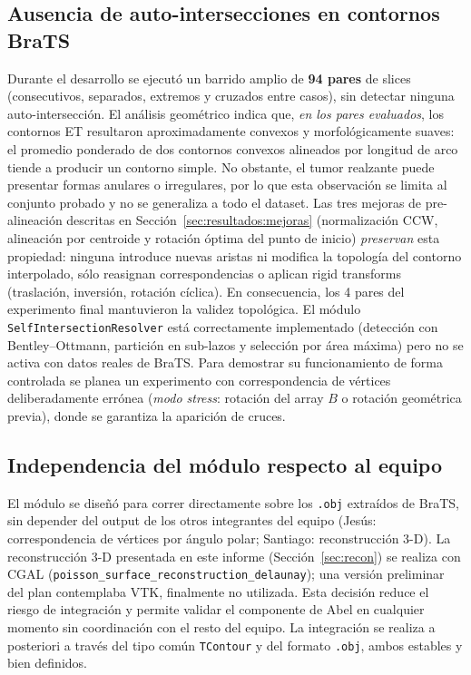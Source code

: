 \documentclass[conference]{IEEEtran}
\begin{document}
\subsection{Ausencia de auto-intersecciones en contornos
            BraTS}
\label{sec:decisiones:noselfint}
Durante el desarrollo se ejecutó un barrido amplio de
\textbf{94 pares} de slices (consecutivos, separados,
extremos y cruzados entre casos), sin detectar ninguna
auto-intersección. El análisis geométrico indica que,
\emph{en los pares evaluados}, los contornos ET resultaron
aproximadamente convexos y morfológicamente suaves: el promedio
ponderado de dos contornos convexos alineados por longitud de arco
tiende a producir un contorno simple. No obstante, el tumor realzante
puede presentar formas anulares o irregulares, por lo que esta
observación se limita al conjunto probado y no se generaliza a todo el
dataset. Las tres mejoras de
pre-alineación descritas en
Sección~\ref{sec:resultados:mejoras} (normalización CCW,
alineación por centroide y rotación óptima del punto de
inicio) \emph{preservan} esta propiedad: ninguna introduce
nuevas aristas ni modifica la topología del contorno
interpolado, sólo reasignan correspondencias o aplican
rigid transforms (traslación, inversión, rotación cíclica).
En consecuencia, los 4 pares del experimento final
mantuvieron la validez topológica. El módulo
\texttt{SelfIntersectionResolver} está correctamente
implementado (detección con Bentley--Ottmann, partición en
sub-lazos y selección por área máxima) pero no se activa
con datos reales de BraTS. Para demostrar su funcionamiento
de forma controlada se planea un experimento con
correspondencia de vértices deliberadamente errónea
(\emph{modo stress}: rotación del array $B$ o rotación
geométrica previa), donde se garantiza la aparición de
cruces.

\subsection{Independencia del módulo respecto al equipo}
\label{sec:decisiones:independencia}
El módulo se diseñó para correr directamente sobre los
\texttt{.obj} extraídos de BraTS, sin depender del output de
los otros integrantes del equipo (Jesús: correspondencia de
vértices por ángulo polar; Santiago: reconstrucción 3-D). La
reconstrucción 3-D presentada en este informe
(Sección~\ref{sec:recon}) se realiza con CGAL
(\texttt{poisson\_surface\_reconstruction\_delaunay}); una versión
preliminar del plan contemplaba VTK, finalmente no utilizada. Esta
decisión reduce el riesgo de integración y
permite validar el componente de Abel en cualquier momento
sin coordinación con el resto del equipo. La integración se
realiza a posteriori a través del tipo común
\texttt{TContour} y del formato \texttt{.obj}, ambos
estables y bien definidos.
\end{document}
